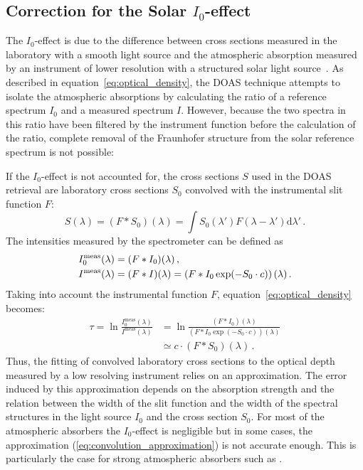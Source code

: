 \subsection{Correction for the Solar $I_0$-effect}\label{sec:correction-solar-i_0}
The $I_0$-effect is due to the difference between cross sections
measured in the laboratory with a smooth light source and the
atmospheric absorption measured by an instrument of lower resolution
with a structured solar light source~\citep{aliwell_2002}.  As
described in equation~\eqref{eq:optical_density}, the DOAS technique
attempts to isolate the atmospheric absorptions by calculating the
ratio of a reference spectrum $I_0$ and a measured spectrum $I$.
However, because the two spectra in this ratio have been filtered by
the instrument function before the calculation of the ratio, complete
removal of the Fraunhofer structure from the solar reference spectrum
is not possible:

If the $I_0$-effect is not accounted for, the cross sections $S$ used
in the DOAS retrieval are laboratory cross sections $S_0$ convolved
with the instrumental slit function $F$:
\begin{equation}
  \label{eq:cross_section_convolved}
  S(\lambda) = (F\ast S_0)(\lambda) = \int S_0(\lambda') F(\lambda-\lambda')\mathrm{d}\lambda' \,.
\end{equation}
The intensities measured by the spectrometer can be defined as
\begin{align}
  \label{eq:incoming_{in}tensity}
  I_0^{\mathrm{meas}}(\lambda) &= (F\ast I_0)(\lambda)\,,\\
  I^{\mathrm{meas}}(\lambda) &= (F\ast I)(\lambda) = \left( F \ast I_0 \exp(-S_0 \cdot c)\right)(\lambda)\,.
\end{align}
Taking into account the instrumental function $F$,
equation~\eqref{eq:optical_density} becomes:
\begin{align}
  \tau = \ln \frac{I_0^{\mathrm{meas}}(\lambda)}{I^{\mathrm{meas}}(\lambda)}
  &  = \ln \frac{ (F \ast I_0)(\lambda)}{ (F \ast I_0 \exp(-S_0 \cdot c))(\lambda)}\\
  & \simeq c \cdot (F * S_0)(\lambda)\,. \label{eq:convolution_approximation}
\end{align}
Thus, the fitting of convolved laboratory cross sections to the
optical depth measured by a low resolving instrument relies on an
approximation.  The error induced by this approximation depends on the
absorption strength and the relation between the width of the slit
function and the width of the spectral structures in the light source
$I_0$ and the cross section $S_0$.  For most of the atmospheric
absorbers the $I_0$-effect is negligible but in some cases, the
approximation (\ref{eq:convolution_approximation}) is not accurate
enough. This is particularly the case for strong atmospheric absorbers
such as \ozone{}.

